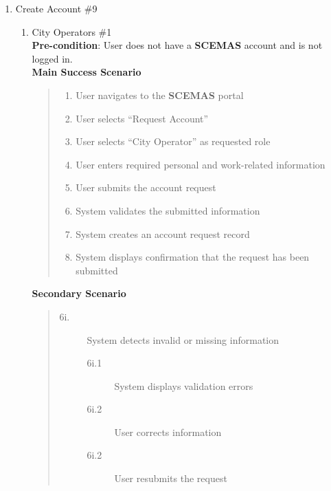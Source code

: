 \documentclass[]{article}
\begin{document}
\begin{enumerate}[{\bf BE9.}]
	\item Create Account \#9
		\begin{enumerate}[{\bf VP1.}]
			\item City Operators \#1\\
                \textbf{Pre-condition}: User does not have a \textbf{SCEMAS} account and is not logged in. \\
                \textbf{Main Success Scenario}
                \begin{quote}
                    \begin{enumerate}[1.]
                        \item User navigates to the \textbf{SCEMAS} portal
                        \item User selects ``Request Account''
                        \item User selects ``City Operator'' as requested role
                        \item User enters required personal and work-related information
                        \item User submits the account request
                        \item System validates the submitted information
                        \item System creates an account request record
                        \item System displays confirmation that the request has been submitted
                    \end{enumerate}
                \end{quote}
                \textbf{Secondary Scenario}
                \begin{quote}
                    \begin{description}
                        \item[\textmd{6i.}] System detects invalid or missing information
                        \begin{description}
                            \item[\textmd{6i.1}] System displays validation errors
                            \item[\textmd{6i.2}] User corrects information
                            \item[\textmd{6i.2}] User resubmits the request
                        \end{description}
                    \end{description}
                \end{quote}
                        

\end{enumerate}
\end{enumerate}
\end{document}
